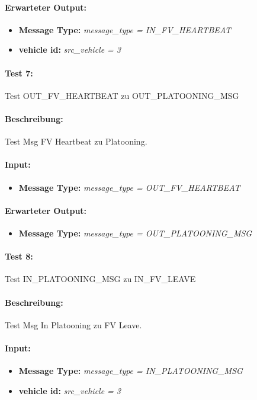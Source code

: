 \documentclass[a4paper, 12pt, titlepage]{scrartcl}
\begin{document}
{			\paragraph{Erwarteter Output:}
			\begin{itemize} \itemsep-0.5em
				\item \textbf{Message Type:} \emph{message\_type = IN\_FV\_HEARTBEAT}
				\item \textbf{vehicle id:} \emph{src\_vehicle = 3}
			\end{itemize}
			
			\paragraph{Test 7:}{Test OUT\_FV\_HEARTBEAT zu OUT\_PLATOONING\_MSG}
			\paragraph{Beschreibung:} Test Msg FV Heartbeat zu Platooning.
			\paragraph{Input:}
			\begin{itemize} \itemsep-0.5em
				\item \textbf{Message Type:} \emph{message\_type = OUT\_FV\_HEARTBEAT}
			\end{itemize}
			\paragraph{Erwarteter Output:}
			\begin{itemize} \itemsep-0.5em
				\item \textbf{Message Type:} \emph{message\_type = OUT\_PLATOONING\_MSG}
			\end{itemize}				
					
			\paragraph{Test 8:}{Test IN\_PLATOONING\_MSG zu IN\_FV\_LEAVE}
			\paragraph{Beschreibung:} Test Msg In Platooning zu FV Leave.
			\paragraph{Input:}
			\begin{itemize} \itemsep-0.5em
				\item \textbf{Message Type:} \emph{message\_type = IN\_PLATOONING\_MSG}
				\item \textbf{vehicle id:} \emph{src\_vehicle = 3}
			\end{itemize}
}
\end{document}
